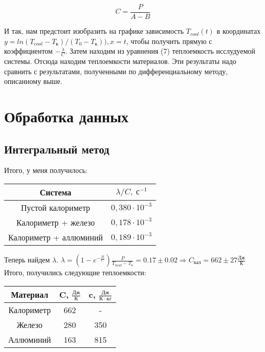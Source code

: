 \documentclass[a4paper, 12pt]{article}
\begin{document}
\begin{equation}
    C = \frac{P}{A - B}
\end{equation}

И так, нам предстоит изобразить на графике зависимость \(T_{cool}(t)\) в координатах \(y = ln(T_{cool} - T_к)/(T_0 - T_к)), x = t\), чтобы получить прямую с коэффициентом \(-\frac{\lambda}{C}\). Затем находим из уравнения (7) теплоемкость исслудуемой системы. Отсюда находим теплоемкости материалов. Эти результаты надо сравнить с результатами, полученными по дифференциальному методу, описанному выше.

\section{Обработка данных}
\subsection{Интегральный метод}
Итого, у меня получилось:
\begin{table}[h]
    \centering
    \begin{tabular}{|c|c|}
    \hline
         Система & \(\lambda/C, \ с^{-1}\) \\
    \hline
         Пустой калориметр      & \(0,380 \cdot 10^{-3}\) \\
         Калориметр + железо    & \(0,178 \cdot 10^{-3}\) \\
         Калориметр + аллюминий & \(0,189\cdot 10^{-3}\) \\
    \hline
    \end{tabular}
\end{table}

Теперь найдем \(\lambda\). \(\lambda = (1 - e^{-\frac{\lambda t}{C}})\frac{P}{T_{heat} - T_к} = 0.17 \pm 0.02 \Rightarrow C_{кал} = 662 \pm 27 \frac{Дж}{К}\)
\\
Итого, получились следующие теплоемкости:
\begin{table}[h]
    \centering
    \begin{tabular}{|c|c|c|}
    \hline
         Материал & C, \(\frac{Дж}{К}\) & c, \(\frac{Дж}{К \cdot кг}\)  \\
    \hline
         Калориметр & 662 & - \\
         Железо     & 280 & 350 \\
         Аллюминий  & 163 & 815 \\
    \hline
    \end{tabular}
\end{table}
\end{document}
